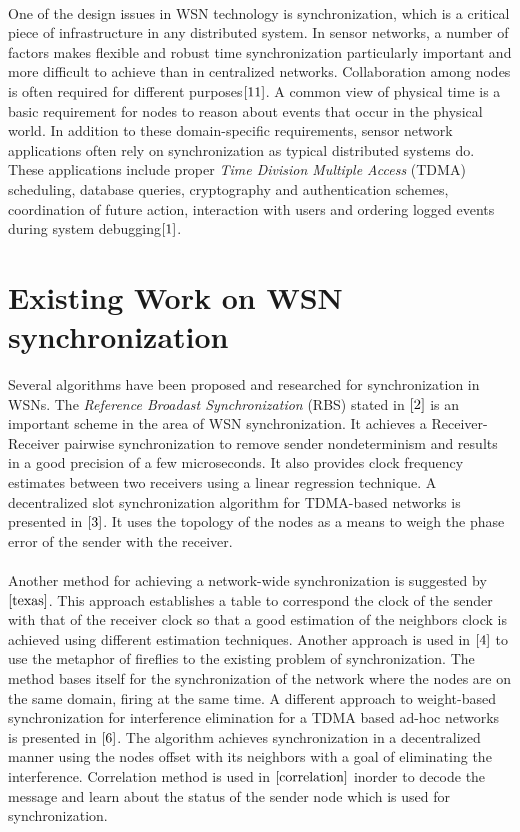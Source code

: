 \documentclass[a4paper,10pt]{report}
\begin{document}
\paragraph*{} One of the design issues in WSN technology is synchronization, which is a critical piece of infrastructure in any
distributed system. In sensor networks, a number of factors makes flexible and robust time synchronization particularly important and
more difficult to achieve than in centralized networks.
Collaboration among nodes is often required for different purposes$\cite{11}$. A common view of physical time is a basic requirement for nodes to reason about events that occur in the physical world. In addition to these domain-specific requirements, sensor network applications often rely on synchronization as typical distributed systems do. These applications include proper \textit{Time Division Multiple Access} (TDMA) scheduling, database queries, cryptography and authentication schemes, coordination of future action, interaction with users and ordering logged events during system debugging$\cite{1}$.
\section{\textbf{Existing Work on WSN synchronization}}\par
Several algorithms have been proposed and researched for synchronization in WSNs. The \textit{Reference Broadast Synchronization} (RBS) stated in $\cite{2}$ is an important scheme in the area of WSN synchronization. It achieves a Receiver-Receiver pairwise synchronization to remove sender nondeterminism and results in a good precision of a few microseconds. It also provides clock frequency estimates between two receivers using a linear regression technique. A decentralized slot synchronization algorithm for TDMA-based networks is presented in $\cite{3}$. It uses the topology of the nodes as a means to weigh the phase error of the sender with the receiver. \paragraph*{}
Another method for achieving a network-wide synchronization is suggested by $\cite{texas}$. This approach establishes a table to
correspond the clock of the sender with that of the receiver clock so that a good estimation of the neighbors clock is achieved using different estimation techniques. Another approach is used in $\cite{4}$ to use the metaphor of fireflies to the existing problem of synchronization. The method bases itself for the synchronization of the network where the nodes are on the same domain, firing at the same time. A different approach to weight-based synchronization for interference elimination for a TDMA based ad-hoc networks is presented in  $\cite{6}$. The algorithm achieves synchronization in a decentralized manner using the nodes offset with its neighbors with a goal of eliminating the interference. Correlation method is used in $\cite{correlation}$ inorder to decode the message and learn about the status of the sender node which is used for synchronization.
\end{document}
